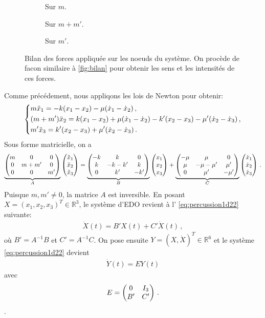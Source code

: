 \begin{figure}[!h]
    \begin{subfigure}[b]{0.25\textwidth}
        \centering
        \caption{Sur $m$.}
        \label{fig:bilan12}
    \end{subfigure}
    \begin{subfigure}[b]{0.31\textwidth}
        \centering
        \caption{Sur $m+m'$.}
        \label{fig:bilan22}
    \end{subfigure}
    \begin{subfigure}[b]{0.23\textwidth}
        \centering
        \caption{Sur $m'$.}
        \label{fig:bilan32}
    \end{subfigure}
       \caption{Bilan des forces appliquée sur les noeuds du système. On procède de facon similaire à \cref{fig:bilan} pour obtenir les sens et les intensités de ces forces.}
       \label{fig:bilan2}
\end{figure}

\noindent Comme précédement, nous appliqons les lois de Newton pour obtenir:
\begin{align}
    \begin{dcases}
    m\ddot x_1 = -k(x_1 - x_2) - \mu (\dot x_1 - \dot x_2) \,, \\
    (m+m')\ddot x_2 = k(x_1 - x_2) + \mu (\dot x_1 - \dot x_2) - k'(x_2 - x_3) - \mu'(\dot x_2 - \dot x_3) \,, \\
        m' \ddot x_3 =  k'(x_2 - x_3) + \mu'(\dot x_2 - \dot x_3) \,. 
    \end{dcases}
\end{align}
Sous forme matricielle, on a
\begin{align}
    \underbrace{\begin{pmatrix} m & 0 & 0 \\ 0 & m+m' & 0 \\ 0 & 0 & m' \end{pmatrix}}_{A} \begin{pmatrix} \ddot{x}_1 \\ \ddot{x}_2 \\ \ddot{x}_3 \end{pmatrix} =  
    \underbrace{\begin{pmatrix} -k & k & 0 \\ k & -k-k' & k \\ 0 & k' & -k' \end{pmatrix}}_{B} \begin{pmatrix} x_1 \\ x_2 \\ x_3 \end{pmatrix} + 
    \underbrace{\begin{pmatrix} -\mu & \mu & 0 \\ \mu & -\mu-\mu' & \mu' \\ 0 & \mu' & -\mu' \end{pmatrix}}_{C} \begin{pmatrix} \dot{x}_1 \\ \dot{x}_2 \\ \dot{x}_3 \end{pmatrix} \,.
\end{align}
Puisque $m, m'\neq 0$, la matrice $A$ est inversible. En posant $X = (x_1, x_2, x_3)^T \in \mathbb{R}^3$, le système d'EDO revient à l' \cref{eq:percussion1d22} suivante:
\begin{align} \label{eq:percussion1d22}
        \ddot{X}(t) = B' X(t) + C'\dot{X}(t) \,, 
\end{align}
où $B' = A^{-1}B$ et $C' = A^{-1}C$. On pose ensuite $Y= (X, \dot X)^T \in \mathbb{R}^6$ et le système \cref{eq:percussion1d22} devient 
\begin{align} \label{eq:systeme1d2}
        \dot{Y}(t)= E Y(t)
\end{align}
avec $$ E = \begin{pmatrix} 0 & I_3 \\ B' & C' \end{pmatrix} \,.$$.


